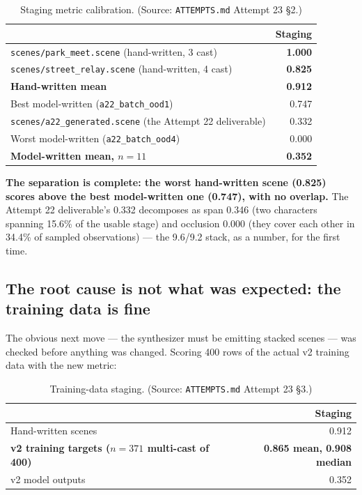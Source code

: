 \documentclass[11pt]{article}
\newcommand{\secsym}{\S}
\begin{document}
\begin{table}[h]
\centering
\caption{Staging metric calibration. (Source: \texttt{ATTEMPTS.md} Attempt 23 \secsym2.)}
\label{tab:stagingcalib}
\begin{tabular}{@{}L{7cm}r@{}}
\toprule
 & Staging \\
\midrule
\texttt{scenes/park\_meet.scene} (hand-written, 3 cast) & \textbf{1.000} \\
\texttt{scenes/street\_relay.scene} (hand-written, 4 cast) & \textbf{0.825} \\
\textbf{Hand-written mean} & \textbf{0.912} \\
Best model-written (\texttt{a22\_batch\_ood1}) & 0.747 \\
\texttt{scenes/a22\_generated.scene} (the Attempt 22 deliverable) & 0.332 \\
Worst model-written (\texttt{a22\_batch\_ood4}) & 0.000 \\
\textbf{Model-written mean, $n=11$} & \textbf{0.352} \\
\bottomrule
\end{tabular}
\end{table}

\textbf{The separation is complete: the worst hand-written scene (0.825)
scores above the best model-written one (0.747), with no overlap.} The
Attempt 22 deliverable's 0.332 decomposes as span 0.346 (two characters
spanning 15.6\% of the usable stage) and occlusion 0.000 (they cover each
other in 34.4\% of sampled observations) --- the 9.6/9.2 stack, as a
number, for the first time.

\subsection{The root cause is not what was expected: the training data is fine}
\label{sec:rootcause}

The obvious next move --- the synthesizer must be emitting stacked scenes
--- was checked before anything was changed. Scoring 400 rows of the
actual v2 training data with the new metric:

\begin{table}[h]
\centering
\caption{Training-data staging. (Source: \texttt{ATTEMPTS.md} Attempt 23 \secsym3.)}
\label{tab:trainingstaging}
\begin{tabular}{@{}L{7cm}r@{}}
\toprule
 & Staging \\
\midrule
Hand-written scenes & 0.912 \\
\textbf{v2 training targets ($n=371$ multi-cast of 400)} & \textbf{0.865 mean, 0.908 median} \\
v2 model outputs & 0.352 \\
\bottomrule
\end{tabular}
\end{table}
\end{document}
